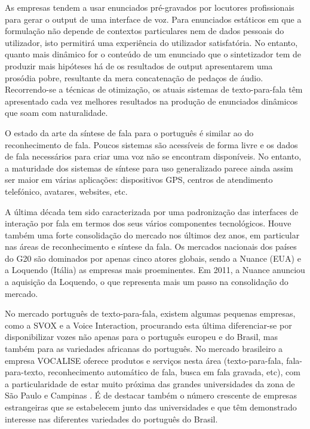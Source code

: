 \begin{multicols}{2}
As empresas tendem a usar enunciados pré-gravados por locutores profissionais para gerar o output de uma interface de voz.
Para enunciados estáticos em que a formulação não depende de contextos par\-ti\-cu\-la\-res 
nem de dados pessoais do utilizador, isto permitirá uma experiência do utilizador satisfatória. 
No entanto, quanto mais dinâmico for o conteúdo de um enunciado que o sintetizador tem de produzir 
mais hipóteses há de os resultados de output apresentarem uma prosódia pobre, 
resultante da mera concatenação de pedaços de áudio. 
Recorrendo-se a técnicas de otimização, os atuais sistemas de texto-para-fala têm apresentado
cada vez melhores resultados na produção de enunciados dinâmicos que soam com naturalidade.


O estado da arte da síntese de fala para o português é similar ao do reconhecimento de fala.
Poucos sistemas são acessíveis de forma livre e os dados de fala necessários para criar uma voz não
se encontram disponíveis. 
No entanto, a maturidade dos sistemas de síntese para uso generalizado
parece ainda assim ser maior em várias aplicações: dispositivos GPS, centros de atendimento telefónico, avatares, websites, etc.


A última década tem sido caracterizada por uma padronização das interfaces de interação por fala 
em termos dos seus vários componentes tecnológicos.
Houve também uma forte consolidação do mercado nos últimos dez anos, em particular nas áreas de reconhecimento e síntese da fala. 
Os mercados nacionais dos países do G20 são dominados por apenas cinco atores globais, 
sendo a Nuance (EUA) e a Loquendo (Itália) as empresas mais proeminentes. 
Em 2011, a Nuance anunciou a aquisição da Loquendo, o que representa mais um passo na consolidação do mercado.

No mercado português de texto-para-fala, existem algumas pequenas empresas, como a SVOX e a Voice Interaction, 
procurando esta última diferenciar-se por disponibilizar vozes não apenas para o português europeu e do Brasil, 
mas também para as variedades africanas do português. 
No mercado brasileiro a empresa VOCALISE oferece produtos e serviços nesta área (texto-para-fala, fala-para-texto, reconhecimento automático de fala, 
busca em fala gravada, etc), com a particularidade de estar muito próxima das grandes universidades da zona de São Paulo e Campinas \cite{neto}.
É de destacar também o número crescente de empresas estrangeiras que se estabelecem junto das universidades 
e que têm demonstrado interesse nas diferentes variedades do português do Brasil.


\end{multicols}
